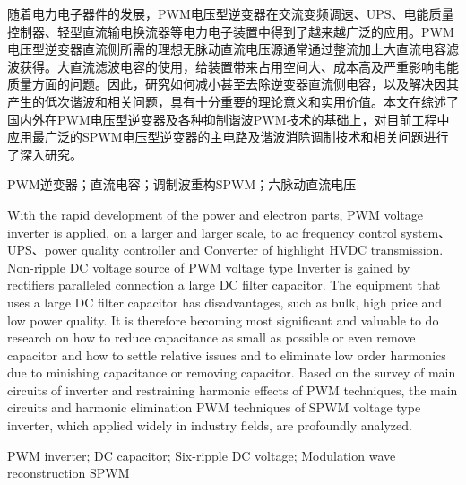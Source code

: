 \documentclass{NEEPU_THESIS}
\begin{document}

\newpage
\setcounter{page}{1}    %

\neepupagestylea
\begin{Abstractcn}
    随着电力电子器件的发展，PWM电压型逆变器在交流变频调速、UPS、电能质量控制器、轻型直流输电换流器等电力电子装置中得到了越来越广泛的应用。PWM电压型逆变器直流侧所需的理想无脉动直流电压源通常通过整流加上大直流电容滤波获得。大直流滤波电容的使用，给装置带来占用空间大、成本高及严重影响电能质量方面的问题。因此，研究如何减小甚至去除逆变器直流侧电容，以及解决因其产生的低次谐波和相关问题，具有十分重要的理论意义和实用价值。本文在综述了国内外在PWM电压型逆变器及各种抑制谐波PWM技术的基础上，对目前工程中应用最广泛的SPWM电压型逆变器的主电路及谐波消除调制技术和相关问题进行了深入研究。
\end{Abstractcn}

\begin{Keywordscn}
    PWM逆变器；直流电容；调制波重构SPWM；六脉动直流电压
\end{Keywordscn}

\newpage
\neepupagestylea
\begin{Abstracten}
    With the rapid development of the power and electron parts, PWM voltage inverter is applied, on a larger and larger scale, to ac frequency control system、UPS、power quality controller and Converter of highlight HVDC transmission. Non-ripple DC voltage source of PWM voltage type Inverter is gained by rectifiers paralleled connection a large DC filter capacitor. The equipment that uses a large DC filter capacitor has disadvantages, such as bulk, high price and low power quality. It is therefore becoming most significant and valuable to do research on how to reduce capacitance as small as possible or even remove capacitor and how to settle relative issues and to eliminate low order harmonics due to minishing capacitance or removing capacitor. Based on the survey of main circuits of inverter and restraining harmonic effects of PWM techniques, the main circuits and harmonic elimination PWM techniques of SPWM voltage type inverter, which applied widely in industry fields, are profoundly analyzed.
\end{Abstracten}
\begin{Keywordsen}
    {PWM inverter; DC capacitor; Six-ripple DC voltage; Modulation wave reconstruction SPWM}
\end{Keywordsen}
\newpage
\end{document}
